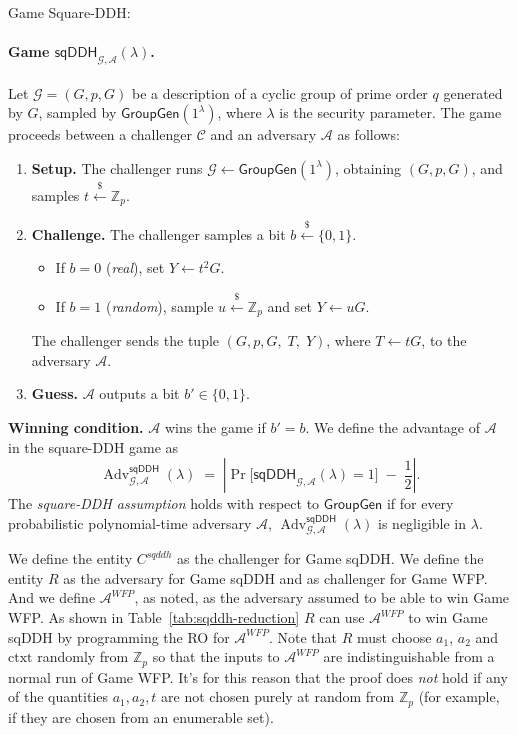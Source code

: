 \documentclass[11pt]{article}
\begin{document}
Game Square-DDH:

\paragraph{Game $\mathsf{sqDDH}_{\mathcal{G}, \mathcal{A}}(\lambda)$.}
Let $\mathcal{G} = (G, p, G)$ be a description of a cyclic group of prime
order $q$ generated by $G$, sampled by
$\mathsf{GroupGen}(1^{\lambda})$, where $\lambda$ is the security
parameter. The game proceeds between a challenger $\mathcal{C}$ and an
adversary $\mathcal{A}$ as follows:

\begin{enumerate}
  \item \textbf{Setup.} The challenger runs
    $\mathcal{G} \gets \mathsf{GroupGen}(1^{\lambda})$, obtaining
    $(G, p, G)$, and samples
    $t \xleftarrow{\$} \mathbb{Z}_{p}$.

  \item \textbf{Challenge.} The challenger samples a bit
    $b \xleftarrow{\$} \{0, 1\}$.
    \begin{itemize}
      \item If $b = 0$ (\emph{real}), set $Y \gets t^{2}G$.
      \item If $b = 1$ (\emph{random}), sample
        $u \xleftarrow{\$} \mathbb{Z}_{p}$ and set $Y \gets uG$.
    \end{itemize}
    The challenger sends the tuple $(G, p, G,\; T,\; Y)$, where
    $T \gets tG$, to the adversary $\mathcal{A}$.

  \item \textbf{Guess.} $\mathcal{A}$ outputs a bit
    $b' \in \{0, 1\}$.
\end{enumerate}

\medskip\noindent
\textbf{Winning condition.} $\mathcal{A}$ wins the game if $b' = b$.
We define the advantage of $\mathcal{A}$ in the square-DDH game as
$$
\operatorname{Adv}^{\mathsf{sqDDH}}_{\mathcal{G},\mathcal{A}}(\lambda)
\;=\;
\left|
  \Pr\!\big[\mathsf{sqDDH}_{\mathcal{G},\mathcal{A}}(\lambda) = 1\big]
  \;-\;
  \frac{1}{2}
\right|.
$$
The \emph{square-DDH assumption} holds with respect to
$\mathsf{GroupGen}$ if for every probabilistic polynomial-time adversary
$\mathcal{A}$,
$\operatorname{Adv}^{\mathsf{sqDDH}}_{\mathcal{G},\mathcal{A}}(\lambda)$
is negligible in $\lambda$.

We define the entity $C^{sqddh}$ as the challenger for Game sqDDH. We define the entity $R$ as the adversary for Game sqDDH and as challenger for Game WFP. And we define $\mathcal{A}^{WFP}$, as noted, as the adversary assumed to be able to win Game WFP. As shown in Table~\ref{tab:sqddh-reduction} $R$ can use $\mathcal{A}^{WFP}$ to win Game sqDDH by programming the RO for $\mathcal{A}^{WFP}$. Note that $R$ must choose $a_1$, $a_2$ and $\textrm{ctxt}$ randomly from $\mathbb{Z}_p$ so that the inputs to $\mathcal{A}^{WFP}$ are indistinguishable from a normal run of Game WFP. It's for this reason that the proof does \emph{not} hold if any of the quantities $a_1, a_2, t$ are not chosen purely at random from $\mathbb{Z}_p$ (for example, if they are chosen from an enumerable set).
\end{document}
